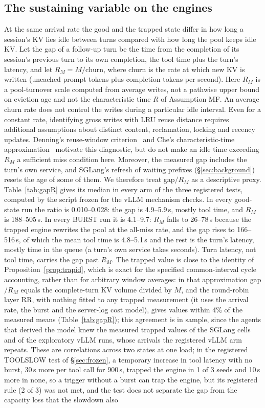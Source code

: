 \subsection{The sustaining variable on the engines}\label{sec:mechanism}
At the same arrival rate the good and the trapped state differ in how long a session's KV lies idle between turns compared with how long the pool keeps idle KV. Let the gap of a follow-up turn be the time from the completion of its session's previous turn to its own completion, the tool time plus the turn's latency, and let $R_M=M/\text{churn}$, where churn is the rate at which new KV is written (uncached prompt tokens plus completion tokens per second). Here $R_M$ is a pool-turnover scale computed from average writes, not a pathwise upper bound on eviction age and not the characteristic time $R$ of Assumption MF. An average churn rate does not control the writes during a particular idle interval. Even for a constant rate, identifying gross writes with LRU reuse distance requires additional assumptions about distinct content, reclamation, locking and recency updates. Denning's reuse-window criterion~\citep{denning1968working} and Che's characteristic-time approximation~\citep{che2002hierarchical} motivate this diagnostic, but do not make an idle time exceeding $R_M$ a sufficient miss condition here. Moreover, the measured gap includes the turn's own service, and SGLang's refresh of waiting prefixes (\S\ref{sec:background}) resets the age of some of them. We therefore treat gap$/R_M$ as a descriptive proxy. Table~\ref{tab:gapR} gives its median in every arm of the three registered tests, computed by the script frozen for the vLLM mechanism checks. In every good-state run the ratio is 0.010--0.028: the gap is 4.9--5.9\,s, mostly tool time, and $R_M$ is 188--505\,s. In every BURST run it is 4.1--9.7: $R_M$ falls to 26--78\,s because the trapped engine rewrites the pool at the all-miss rate, and the gap rises to 166--516\,s, of which the mean tool time is 4.8--5.1\,s and the rest is the turn's latency, mostly time in the queue (a turn's own service takes seconds). Turn latency, not tool time, carries the gap past $R_M$. The trapped value is close to the identity of Proposition~\ref{prop:trapid}, which is exact for the specified common-interval cycle accounting, rather than for arbitrary window averages: in that approximation gap$/R_M$ equals the complete-turn KV volume divided by $M$, and the round-robin layer RR, with nothing fitted to any trapped measurement (it uses the arrival rate, the burst and the server-log cost model), gives values within 4\% of the measured means (Table~\ref{tab:gapR}); this agreement is in sample, since the agents that derived the model knew the measured trapped values of the SGLang cells and of the exploratory vLLM runs, whose arrivals the registered vLLM arm repeats. These are correlations across two states at one load; in the registered TOOLSLOW test of \S\ref{sec:frozen}, a temporary increase in tool latency with no burst, 30\,s more per tool call for 900\,s, trapped the engine in 1 of 3 seeds and 10\,s more in none, so a trigger without a burst can trap the engine, but its registered rule (2 of 3) was not met, and the test does not separate the gap from the capacity loss that the slowdown also 